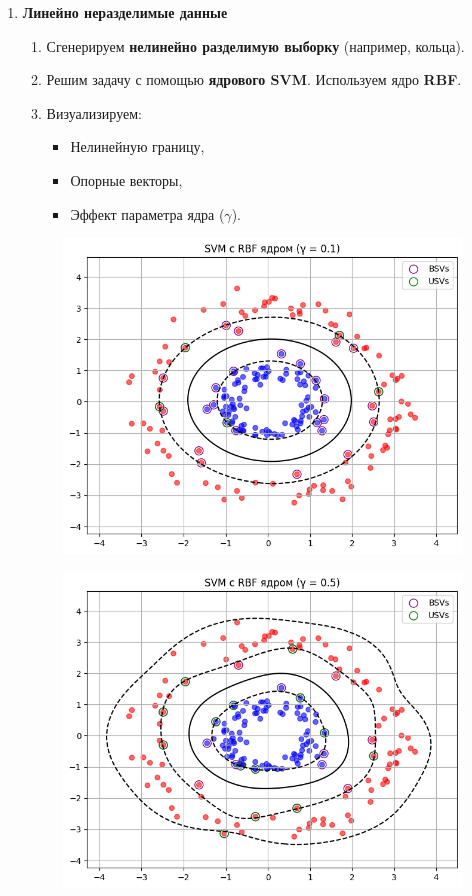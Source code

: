 \begin{enumerate}
\begin{figure}[H]
        \caption {}
    \end{figure}
\item \textbf{Линейно неразделимые данные}
\begin{enumerate}
    \item Сгенерируем \textbf{нелинейно разделимую выборку} (например, кольца).
    \item Решим задачу с помощью \textbf{ядрового SVM}. Используем ядро \textbf{RBF}.
    \item Визуализируем:
    \begin{itemize}
        \item Нелинейную границу,
        \item Опорные векторы,
        \item Эффект параметра ядра ($\gamma$).
    \end{itemize}
\end{enumerate}
    \begin{figure}[H]
        \centering
        \includegraphics[width=0.75\linewidth]{assets/3.1.png}
        \caption {}
    \end{figure}
    \begin{figure}[H]
        \centering
        \includegraphics[width=0.75\linewidth]{assets/3.2.png}

\end{figure}
\end{enumerate}
